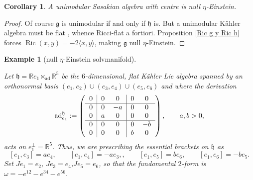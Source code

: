 \documentclass[12pt, twoside]{amsart}
\def\g{\mathfrak{g}}
\def\h{\mathfrak{h}}
\def\R{\mathbb{R}}
\def\ad{\operatorname{ad}}
\def\ric{\operatorname{Ric}}
\newtheorem{coro}[definition]{Corollary}
\newtheorem{example}[definition]{\bf Example}
\theoremstyle{definition}
\begin{document}
\begin{coro}\label{coro: eta-einstein flat}
A unimodular Sasakian algebra with centre is null $\eta$-Einstein. 
\end{coro}

\begin{proof}
Of course $\g$ is unimodular if and only if $\h$ is. But a unimodular K{\"a}hler algebra must be flat \cite{Hano}, whence 
Ricci-flat a fortiori. Proposition \ref{Ric g y Ric h} forces  $\ric(x,y)=-2\langle x , y \rangle$, making $\g$ null $\eta$-Einstein.
\end{proof}

\begin{example}[null $\eta$-Einstein solvmanifold] \label{ex: null solvmanifold}
{\rm Let $\h=\R e_1 \ltimes_{\ad}\R^5$ be the $6$-dimensional, flat K{\"a}hler Lie algebra spanned by an orthonormal basis $(e_1,e_2)\cup (e_3,e_4)\cup (e_5,e_6)$ and where the derivation
\begin{equation}\label{eq: matrix ad_e1}
    \ad_{e_1}^\h:=
\left(\begin{tabular}{c | c c | c c}
        $0$&$0$&$0$&$0$&$0$\\ \hline
        $0$&$0$&$-a$&$0$&$0$\\
        $0$&$a$&$0$&$0$&$0$\\ \hline
        $0$&$0$&$0$&$0$&$-b$\\
        $0$&$0$&$0$&$b$&$0$
\end{tabular}\right),
    \qquad a,b>0,
\end{equation}
acts on $e_1^\perp=\R^5$. Thus, we are prescribing the essential brackets on $\h$ as
$$[e_1,e_3]=ae_4,\qquad [e_1,e_4]=-ae_3, ,\qquad 
[e_1,e_5]=be_6,\qquad [e_1,e_6]=-be_5.$$
Set $Je_1=e_2$, $Je_3=e_4$,$Je_5=e_6$, so that the fundamental $2$-form is $\omega=-e^{12}-e^{34}-e^{56}$.

}
\end{example}
\end{document}
